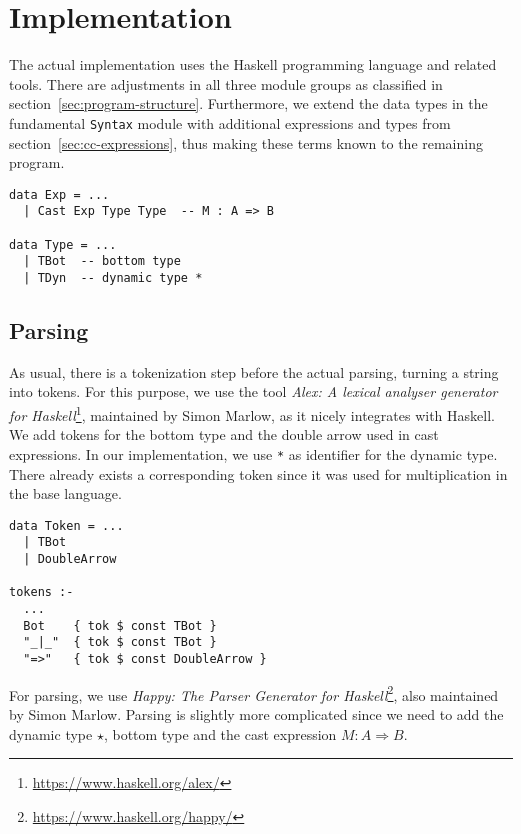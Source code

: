 \chapter{Implementation}\label{chap:implementation}

The actual implementation uses the Haskell programming language and related tools. There are adjustments in all three module groups as classified in section~\ref{sec:program-structure}. Furthermore, we extend the data types in the fundamental \texttt{Syntax} module with additional expressions and types from section~\ref{sec:cc-expressions}, thus making these terms known to the remaining program.

\begin{lstlisting}[caption=Haskell: Extensions to \texttt{Syntax.hs}]
data Exp = ...
  | Cast Exp Type Type  -- M : A => B

data Type = ...
  | TBot  -- bottom type
  | TDyn  -- dynamic type *
\end{lstlisting}

\section{Parsing}

As usual, there is a tokenization step before the actual parsing, turning a string into tokens. For this purpose, we use the tool \emph{Alex: A lexical analyser generator for Haskell}\footnote{\url{https://www.haskell.org/alex/}}, maintained by Simon Marlow, as it nicely integrates with Haskell. We add tokens for the bottom type and the double arrow used in cast expressions. In our implementation, we use \texttt{*} as identifier for the dynamic type. There already exists a corresponding token since it was used for multiplication in the base language.

\begin{lstlisting}[float,
  caption=Haskell: Additional tokens (\texttt{Parsing/Tokens.x})]
data Token = ...
  | TBot
  | DoubleArrow

tokens :-
  ...
  Bot    { tok $ const TBot }
  "_|_"  { tok $ const TBot }
  "=>"   { tok $ const DoubleArrow }
\end{lstlisting}

For parsing, we use \emph{Happy: The Parser Generator for Haskell}\footnote{\url{https://www.haskell.org/happy/}}, also maintained by Simon Marlow. Parsing is slightly more complicated since we need to add the dynamic type $\star$, bottom type and the cast expression $M : A \Rightarrow B$.

